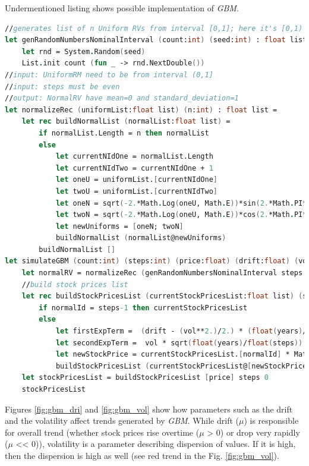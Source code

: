     Undermentioned listing shows possible implementation of \textit{GBM}.
    \begin{lstlisting}[language=FSharp, label={lst:gbm}, caption=F\# implementation of \textit{Geometric Brownian Motion}.]
//generates list of n Uniform RVs from interval [0,1]; here it's [0,1)
let genRandomNumbersNominalInterval (count:int) (seed:int) : float list =
    let rnd = System.Random(seed)
    List.init count (fun _ -> rnd.NextDouble())
//input: UniformRM need to be from interval (0,1]
//input: steps must be even
//output: NormalRV have mean=0 and standard_deviation=1
let normalizeRec (uniformList:float list) (n:int) : float list =
    let rec buildNormalList (normalList:float list) =
        if normalList.Length = n then normalList
        else
            let currentNIdOne = normalList.Length
            let currentNIdTwo = currentNIdOne + 1
            let oneU = uniformList.[currentNIdOne]
            let twoU = uniformList.[currentNIdTwo]
            let oneN = sqrt(-2.*Math.Log(oneU, Math.E))*sin(2.*Math.PI*twoU)
            let twoN = sqrt(-2.*Math.Log(oneU, Math.E))*cos(2.*Math.PI*twoU)
            let newUniforms = [oneN; twoN]
            buildNormalList (normalList@newUniforms)
        buildNormalList []
let simulateGBM (count:int) (steps:int) (price:float) (drift:float) (vol:float) (years:float) (seed:int) =
    let normalRV = normalizeRec (genRandomNumbersNominalInterval steps seed) steps
    //build stock prices list
    let rec buildStockPricesList (currentStockPricesList:float list) (steps:int) (normalId:int) : float list =
        if normalId = steps-1 then currentStockPricesList
        else
            let firstExpTerm =  (drift - (vol**2.)/2.) * (float(years)/float(steps))
            let secondExpTerm =  vol * sqrt(float(years)/float(steps)) * normalRV.[normalId]
            let newStockPrice = currentStockPricesList.[normalId] * Math.E ** (firstExpTerm + secondExpTerm)
            buildStockPricesList (currentStockPricesList@[newStockPrice]) steps (normalId+1)
    let stockPricesList = buildStockPricesList [price] steps 0
    stockPricesList
        \end{lstlisting}
    Figures \ref{fig:gbm_dri} and \ref{fig:gbm_vol} show how parameters such as the drift and the volatility affect trends generated by \textit{GBM}. While drift ($\mu$) is responsible for overall trend (whether stock prices rise overtime ($\mu$ > 0) or drop very rapidly ($\mu$ << 0)), volatility is a parameter describing dispersion of values. If it is high, then the dispersion is high as well (see red trend in the Fig. \ref{fig:gbm_vol}).
